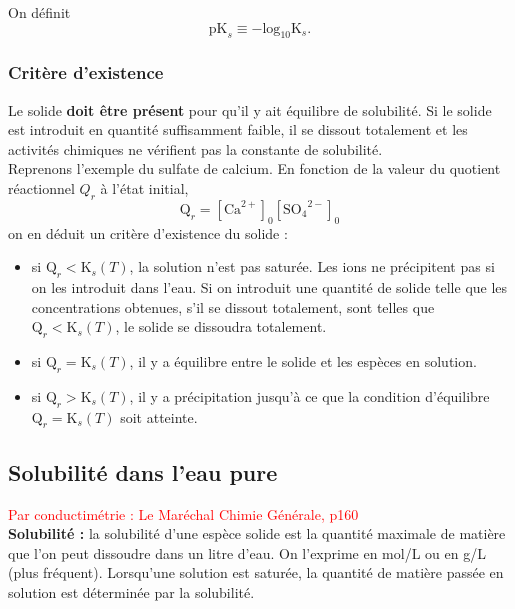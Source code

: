 \documentclass[11pt,a4paper]{report}
\begin{document}
On définit
\begin{equation}
	\boxed{\text{pK}_s \equiv -\text{log}_{10} \text{K}_s}.
\end{equation}

\subsubsection{Critère d'existence}
Le solide \textbf{doit être présent} pour qu'il y ait équilibre de solubilité. Si le solide est introduit en quantité suffisamment faible, il se dissout totalement et les activités chimiques ne vérifient pas la constante de solubilité.\\

Reprenons l'exemple du sulfate de calcium. En fonction de la valeur du quotient réactionnel $Q_r$ à l'état initial,
\begin{equation}
	\text{Q}_r = [\text{Ca}^{2+}]_0 [{\text{SO}_4}^{2-}]_0
\end{equation}
on en déduit un critère d'existence du solide :\\
\begin{itemize}
	\item si $\text{Q}_r < \text{K}_s(T)$, la solution n'est pas saturée. Les ions ne précipitent 		pas si on les introduit dans l'eau. Si on introduit une quantité de solide telle que les 			concentrations obtenues, s'il se dissout totalement, sont telles que $\text{Q}_r < 
	\text{K}_s(T)$, le solide se dissoudra totalement.
	\item si $\text{Q}_r = \text{K}_s(T)$, il y a équilibre entre le solide et les espèces en 			solution.
	\item si $\text{Q}_r > \text{K}_s(T)$, il y a précipitation jusqu'à ce que la condition 			d'équilibre $\text{Q}_r = \text{K}_s(T)$ soit atteinte.\\
\end{itemize}

\newpage
\subsection{Solubilité dans l'eau pure}
\textcolor{red}{Par conductimétrie : Le Maréchal Chimie Générale, p160}\\

\textbf{Solubilité :} la solubilité d'une espèce solide est la quantité maximale de matière que l'on peut dissoudre dans un litre d'eau. On l'exprime en mol/L ou en g/L (plus fréquent). Lorsqu'une solution est saturée, la quantité de matière passée en solution est déterminée par la solubilité.\\
\end{document}
